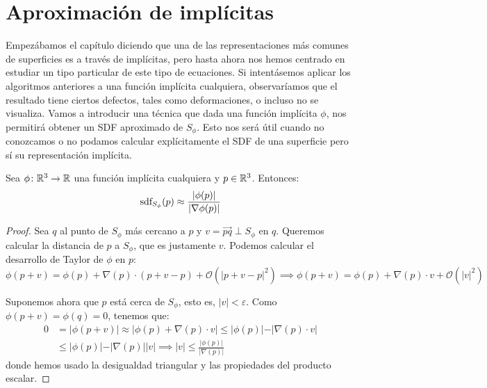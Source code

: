 \section{Aproximación de implícitas}
Empezábamos el capítulo diciendo que una de las representaciones más comunes de superficies es a través de implícitas, pero hasta ahora nos hemos centrado en estudiar un tipo particular de este tipo de ecuaciones. Si intentásemos aplicar los algoritmos anteriores a una función implícita cualquiera, observaríamos que el resultado tiene ciertos defectos, tales como deformaciones, o incluso no se visualiza. Vamos a introducir una técnica que dada una función implícita $\phi$, nos permitirá obtener un SDF aproximado de $S_\phi$. Esto nos será útil cuando no conozcamos o no podamos calcular explícitamente el SDF de una superficie pero sí su representación implícita.

\begin{proposicion}
    Sea $\phi\colon \mathbb{R}^3\to\mathbb{R}$ una función implícita cualquiera y $p\in\mathbb{R}^3$. Entonces: 
    \begin{equation*}    
        \text{sdf}_{S_\phi}(p) \approx \frac{\vert \phi(p)\vert}{\vert \nabla\phi(p)\vert}
    \end{equation*}
\end{proposicion}
\begin{proof}
    Sea $q$ al punto de $S_\phi$ más cercano a $p$ y $v=\vec{pq} \perp S_\phi$ en $q$. Queremos calcular la distancia de $p$ a $S_\phi$, que es justamente $v$. Podemos calcular el desarrollo de Taylor de $\phi$ en $p$:
    \begin{equation*}
        \phi(p+v) = \phi(p) + \nabla(p)\cdot (p+v-p) + \mathcal{O}(\vert p+v-p\vert^2) \implies \phi(p+v) = \phi(p) + \nabla(p)\cdot v + \mathcal{O}(\vert v\vert^2)
    \end{equation*}

    Suponemos ahora que $p$ está cerca de $S_\phi$, esto es, $\vert v\vert < \varepsilon$. Como $\phi(p+v) = \phi(q)=0$, tenemos que:
    \begin{align*}
        0 &= \vert \phi(p+v)\vert \approx \vert \phi(p) + \nabla(p)\cdot v \vert \le \vert \phi(p)\vert - \vert \nabla(p)\cdot v \vert\\
         &\le \vert \phi(p)\vert - \vert \nabla(p)\vert \vert v \vert \implies \vert v\vert \le \frac{\vert \phi(p)\vert}{\vert \nabla(p)\vert}
    \end{align*}
    donde hemos usado la desigualdad triangular y las propiedades del producto escalar.
\end{proof}


